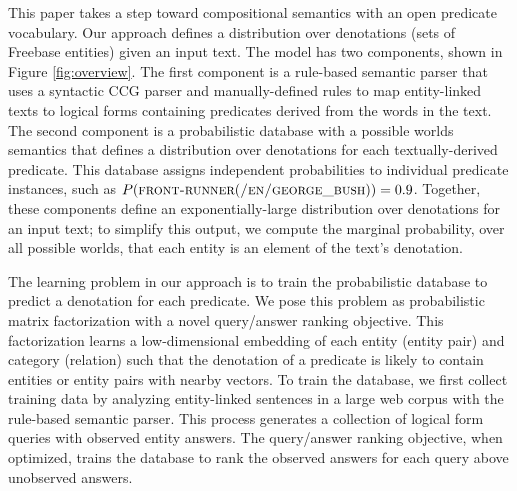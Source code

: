 \documentclass[11pt]{article}
\newcommand{\pred}[1]{\textsc{#1}}
\begin{document}

This paper takes a step toward compositional semantics with an open
predicate vocabulary. Our approach defines a distribution over
denotations (sets of Freebase entities) given an input text.  The
model has two components, shown in Figure \ref{fig:overview}. The
first component is a rule-based semantic parser that uses a syntactic
CCG parser and manually-defined rules to map entity-linked texts to
logical forms containing predicates derived from the words in the
text. The second component is a probabilistic database with a possible
worlds semantics that defines a distribution over denotations for each
textually-derived predicate. This database assigns independent
probabilities to individual predicate instances, such as
$P(\pred{front-runner}(\pred{/en/george\_bush})) = 0.9$. Together,
these components define an exponentially-large distribution over
denotations for an input text; to simplify this output, we compute the
marginal probability, over all possible worlds, that each entity is an
element of the text's denotation.


The learning problem in our approach is to train the probabilistic
database to predict a denotation for each predicate. We pose this
problem as probabilistic matrix factorization with a novel
query/answer ranking objective. This factorization learns a
low-dimensional embedding of each entity (entity pair) and category
(relation) such that the denotation of a predicate is likely to
contain entities or entity pairs with nearby vectors. To train the
database, we first collect training data by analyzing entity-linked
sentences in a large web corpus with the rule-based semantic
parser. This process generates a collection of logical form queries
with observed entity answers. The query/answer ranking objective, when
optimized, trains the database to rank the observed answers for each
query above unobserved answers.
\end{document}
